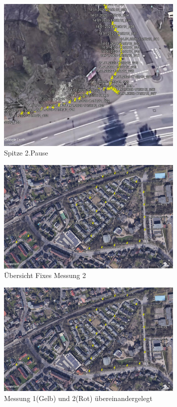 \begin{figure}[h!]
    \centering
    \includegraphics[width=0.8\textwidth]{Route1_abweichung_pause_2}
    \caption{Spitze 2.Pause}
    \label{fig:map}
\end{figure}

\begin{figure}[h!]
    \centering
    \includegraphics[width=0.8\textwidth]{Route2}
    \caption{Übersicht Fixes Messung 2}
    \label{fig:map}
\end{figure}

\begin{figure}[h!]
    \centering
    \includegraphics[width=0.8\textwidth]{Route2}
    \caption{Messung 1(Gelb) und 2(Rot) übereinandergelegt}
    \label{fig:map}
\end{figure}

